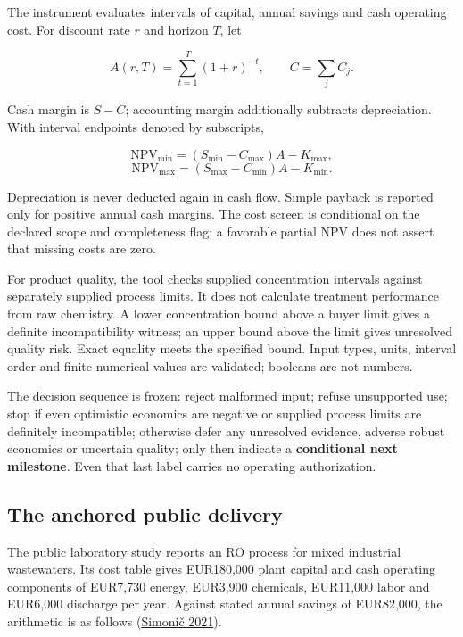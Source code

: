 \documentclass[
  11pt,
  letterpaper,
]{article}
\begin{document}
The instrument evaluates intervals of capital, annual savings and cash
operating cost. For discount rate \(r\) and horizon \(T\), let

\[A(r,T)=\sum_{t=1}^{T}(1+r)^{-t},\qquad C=\sum_j C_j.\]

Cash margin is \(S-C\); accounting margin additionally subtracts
depreciation. With interval endpoints denoted by subscripts,

\[\mathrm{NPV}_{\min}=(S_{\min}-C_{\max})A-K_{\max},\]
\[\mathrm{NPV}_{\max}=(S_{\max}-C_{\min})A-K_{\min}.\]

Depreciation is never deducted again in cash flow. Simple payback is
reported only for positive annual cash margins. The cost screen is
conditional on the declared scope and completeness flag; a favorable
partial NPV does not assert that missing costs are zero.

For product quality, the tool checks supplied concentration intervals
against separately supplied process limits. It does not calculate
treatment performance from raw chemistry. A lower concentration bound
above a buyer limit gives a definite incompatibility witness; an upper
bound above the limit gives unresolved quality risk. Exact equality
meets the specified bound. Input types, units, interval order and finite
numerical values are validated; booleans are not numbers.

The decision sequence is frozen: reject malformed input; refuse
unsupported use; stop if even optimistic economics are negative or
supplied process limits are definitely incompatible; otherwise defer any
unresolved evidence, adverse robust economics or uncertain quality; only
then indicate a \textbf{conditional next milestone}. Even that last
label carries no operating authorization.

\hypertarget{the-anchored-public-delivery}{%
\subsection{The anchored public
delivery}\label{the-anchored-public-delivery}}

The public laboratory study reports an RO process for mixed industrial
wastewaters. Its cost table gives EUR180,000 plant capital and cash
operating components of EUR7,730 energy, EUR3,900 chemicals, EUR11,000
labor and EUR6,000 discharge per year. Against stated annual savings of
EUR82,000, the arithmetic is as follows
(\protect\hyperlink{ref-simonic2021}{Simonič 2021}).
\end{document}
